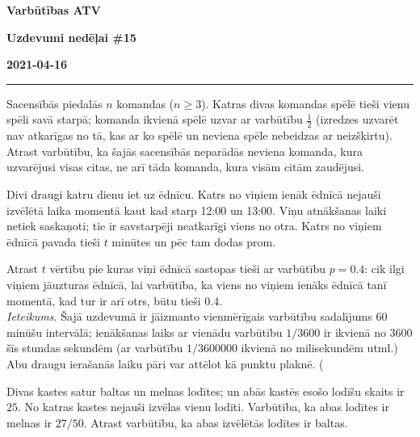 \documentclass[a4paper,12pt]{article}
\begin{document}
\clearpage
\begin{center}
\parbox{3.5cm}{\flushleft\bf Varbūtības \newline ATV} \hfill {\bf\LARGE Uzdevumi nedēļai \#15} \hfill \parbox{3.5cm}{\flushright\bf 2021-04-16} %
\end{center}

\hrule


\vspace{10pt}
\begin{problem}
Sacensībās piedalās $n$ komandas ($n \geq 3$). Katras divas komandas spēlē tieši vienu spēli savā starpā; 
komanda ikvienā spēlē uzvar ar varbūtību $\frac{1}{2}$ (izredzes uzvarēt nav atkarīgas no tā, kas
ar ko spēlē un neviena spēle nebeidzas ar neizšķirtu).\\
Atrast varbūtību, ka šajās sacensībās neparādās neviena komanda, kura uzvarējusi visas citas, ne arī 
tāda komanda, kura visām citām zaudējusi.
\end{problem}

\vspace{10pt}
\begin{problem}
Divi draugi katru dienu iet uz ēdnīcu. Katrs no viņiem ienāk ēdnīcā nejauši izvēlētā
laika momentā \textendash{} kaut kad starp 12:00 un 13:00. Viņu atnākšanas laiki netiek 
saskaņoti; tie ir savstarpēji neatkarīgi viens no otra. Katrs no viņiem ēdnīcā pavada tieši $t$
minūtes un pēc tam dodas prom.

Atrast $t$ vērtību pie kuras viņi ēdnīcā sastopas tieši ar varbūtību $p=0.4$: 
cik ilgi viņiem jāuzturas ēdnīcā, lai varbūtība, ka viens no viņiem ienāks ēdnīcā tanī momentā, 
kad tur ir arī otrs, būtu tieši $0.4$.\\
{\em Ieteikums.} Šajā uzdevumā ir jāizmanto vienmērīgais varbūtību sadalījums $60$ minūšu 
intervālā; ienākšanas laiks ar vienādu varbūtību $1/3600$ ir ikvienā no $3600$ šīs stundas sekundēm
(ar varbūtību $1/3600000$ ikvienā no milisekundēm utml.) 
Abu draugu ierašanās laiku pāri var attēlot kā punktu plaknē.
(
\end{problem}

\vspace{10pt}
\begin{problem}
Divas kastes satur baltas un melnas lodītes; un abās kastēs esošo lodīšu skaits ir $25$. 
No katras kastes nejauši izvēlas vienu lodīti. Varbūtība, ka abas lodītes ir melnas
ir $27/50$. Atrast varbūtību, ka abas izvēlētās lodītes ir baltas. 
\end{problem}
\end{document}
